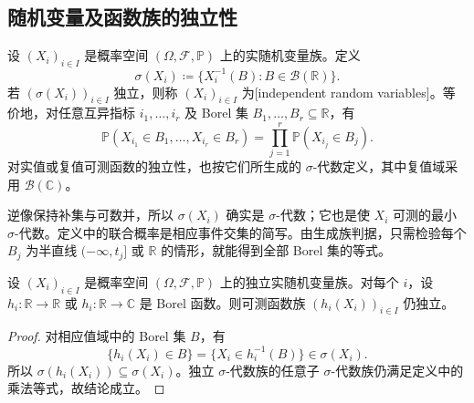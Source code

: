 \subsection{随机变量及函数族的独立性}
\label{b1:subsec:300202}

\begin{definition}\label{b1:def:30-independent-variables}
设 \((X_i)_{i\in I}\) 是概率空间 \((\Omega,\mathcal F,\mathbb P)\) 上的实随机变量族。定义
\[
 \sigma(X_i)\coloneqq\{X_i^{-1}(B):B\in\mathcal B(\mathbb R)\}.
\]
若 \((\sigma(X_i))_{i\in I}\) 独立，则称 \((X_i)_{i\in I}\) 为[independent random variables]。等价地，对任意互异指标 \(i_1,\ldots,i_r\) 及 Borel 集 \(B_1,\ldots,B_r\subseteq\mathbb R\)，有
\[
 \mathbb P(X_{i_1}\in B_1,\ldots,X_{i_r}\in B_r)
 =\prod_{j=1}^r\mathbb P(X_{i_j}\in B_j).
\]
对实值或复值可测函数的独立性，也按它们所生成的 \(\sigma\)-代数定义，其中复值域采用 \(\mathcal B(\mathbb C)\)。
\end{definition}

逆像保持补集与可数并，所以 \(\sigma(X_i)\) 确实是 \(\sigma\)-代数；它也是使 \(X_i\) 可测的最小 \(\sigma\)-代数。定义中的联合概率是相应事件交集的简写。由生成族判据，只需检验每个 \(B_j\) 为半直线 \(({-\infty},t_j]\) 或 \(\mathbb R\) 的情形，就能得到全部 Borel 集的等式。

\begin{proposition}\label{b1:prop:30-independent-functions}
设 \((X_i)_{i\in I}\) 是概率空间 \((\Omega,\mathcal F,\mathbb P)\) 上的独立实随机变量族。对每个 \(i\)，设 \(h_i:\mathbb R\to\mathbb R\) 或 \(h_i:\mathbb R\to\mathbb C\) 是 Borel 函数。则可测函数族 \((h_i(X_i))_{i\in I}\) 仍独立。
\end{proposition}
\begin{proof}
对相应值域中的 Borel 集 \(B\)，有
\[
 \{h_i(X_i)\in B\}=\{X_i\in h_i^{-1}(B)\}\in\sigma(X_i).
\]
所以 \(\sigma(h_i(X_i))\subseteq\sigma(X_i)\)。独立 \(\sigma\)-代数族的任意子 \(\sigma\)-代数族仍满足定义中的乘法等式，故结论成立。
\end{proof}

